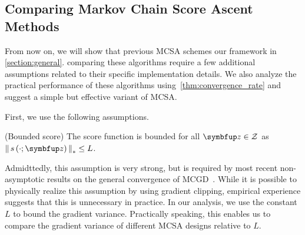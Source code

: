 


\subsection{Comparing Markov Chain Score Ascent Methods}\label{section:comparison}
From now on, we will show that previous MCSA schemes our framework in \cref{section:general}.
comparing these algorithms require a few additional assumptions related to their specific implementation details.
We also analyze the practical performance of these algorithms using~\cref{thm:convergence_rate} and suggest a simple but effective variant of MCSA.

First, we use the following assumptions.
%
\begin{assumption}{(Bounded score)}\label{thm:bounded_score}
  The score function is bounded for all \(\vz \in \mathcal{Z}\) as \(\norm{s\left(\cdot; \vz\right)}_{*} \leq L \).
\end{assumption}
Admidttedly, this assumption is very strong, but is required by most recent non-asymptotic results on the general convergence of MCGD~\citep{NEURIPS2018_1371bcce, doan_convergence_2020, pmlr-v99-karimi19a, Xiong_Xu_Liang_Zhang_2021}.
While it is possible to physically realize this assumption by using gradient clipping, empirical experience suggests that this is unnecessary in practice.
In our analysis, we use the constant \(L\) to bound the gradient variance.
Practically speaking, this enables us to compare the gradient variance of different MCSA designs relative to \(L\).

